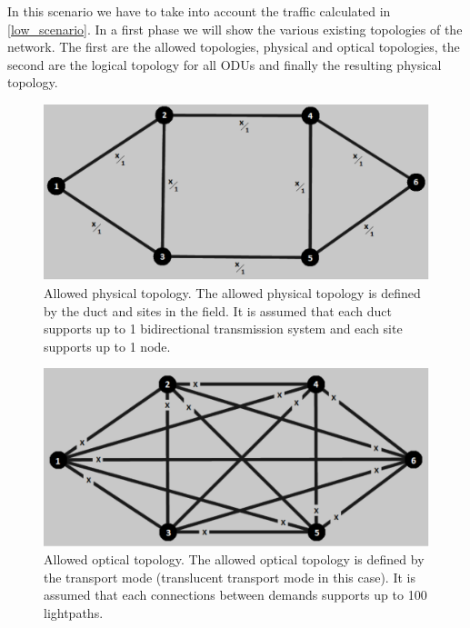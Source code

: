 In this scenario we have to take into account the traffic calculated in \ref{low_scenario}. In a first phase we will show the various existing topologies of the network. The first are the allowed topologies, physical and optical topologies, the second are the logical topology for all ODUs and finally the resulting physical topology.\\

\begin{figure}[H]
\centering
\includegraphics[width=13cm]{sdf/heuristic/translucent_protection/figures/allowed_physical}
\caption{Allowed physical topology. The allowed physical topology is defined by the duct and sites in the field. It is assumed that each duct supports up to 1 bidirectional transmission system and each site supports up to 1 node.}
\label{allowed_physical_protec_ref_low_heuristic_translucent}
\end{figure}

\begin{figure}[H]
\centering
\includegraphics[width=13cm]{sdf/heuristic/translucent_protection/figures/allowed_optical}
\caption{Allowed optical topology. The allowed optical topology is defined by the transport mode (translucent transport mode in this case). It is assumed that each connections between demands supports up to 100 lightpaths.}
\label{allowed_optical_protec_ref_low_heuristic_translucent}
\end{figure}

